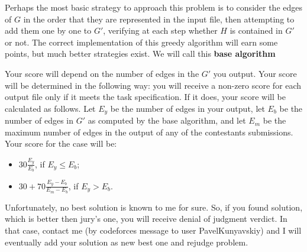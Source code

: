 Perhaps the most basic strategy to approach this problem is to consider the edges of $G$ in the order that they are represented in the input file, then attempting to add them one by one to $G'$, verifying at each step whether $H$ is contained in $G'$ or not. The correct implementation of this greedy algorithm will earn some points, but much better strategies exist. We will call this {\bf base algorithm}

Your score will depend on the number of edges in the $G'$ you output. Your score will be determined in the following way: you will receive a non-zero score for each output file only if it meets the task specification. If it does, your score will be calculated as follows. Let $E_y$ be the number of edges in your output, let $E_b$ be the number of edges in $G'$ as computed by the base algorithm, and let $E_m$ be the maximum number of edges in the output of any of the contestants submissions. Your
score for the case will be: 

\begin{itemize}
\item $30 \frac{E_y}{E_b}$, if $E_y \le E_b$;
\item $30 + 70 \frac{E_y - E_b}{E_m - E_b}$, if $E_y > E_b$.
\end{itemize}


Unfortunately, no best solution is known to me for sure. So, if you found solution, which is better then jury's one, you will receive denial of judgment verdict. In that case, contact me (by codeforces message to user PavelKunyavskiy) and I will eventually add your solution as new best one and rejudge problem.
